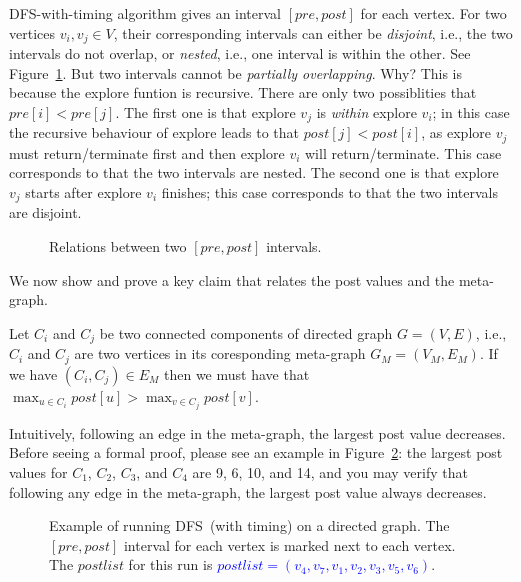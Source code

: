 DFS-with-timing algorithm gives an interval $[pre,post]$ for each vertex.
For two vertices $v_i,v_j\in V$, their corresponding intervals can either be
\emph{disjoint}, i.e., the two intervals do not overlap, or \emph{nested}, i.e.,
one interval is within the other. See Figure~\ref{fig:interval}.
But two intervals cannot be \emph{partially overlapping}. Why? This is because
the explore funtion is recursive. There are only two possiblities
that $pre[i] < pre[j]$. The first one is that explore $v_j$ is \emph{within} explore $v_i$;
in this case the recursive behaviour of explore leads to that $post[j] < post[i]$,
as explore $v_j$ must return/terminate first and then explore $v_i$ will return/terminate.
This case corresponds to that the two intervals are nested.
The second one is that explore $v_j$ starts after explore $v_i$ finishes;
this case corresponds to that the two intervals are disjoint.

\begin{figure}[h!]
\centering{}
\caption{Relations between two $[pre,post]$ intervals.}
\label{fig:interval}
\end{figure}

We now show and prove a key claim that relates the post values and the meta-graph.

\begin{claim}
Let $C_i$ and $C_j$ be two connected components of directed graph $G = (V, E)$, i.e., $C_i$ and $C_j$ are two
vertices in its coresponding meta-graph $G_M = (V_M, E_M)$. If we have $(C_i, C_j) \in E_M$ then
we must have that $\max_{u\in C_i} post[u] > \max_{v\in C_j} post[v]$.
\end{claim}

Intuitively, following an edge in the meta-graph, the largest post value decreases.
Before seeing a formal proof, please see an example in Figure~\ref{fig:dfs}:
the largest post values for $C_1$, $C_2$, $C_3$, and $C_4$ are 9, 6, 10, and 14,
and you may verify that following any edge in the meta-graph, the largest post value always decreases.

\begin{figure}[h!]
\centering{}
\caption{Example of running DFS~(with timing) on a directed graph. The $[pre,post]$ interval for each vertex
is marked next to each vertex.  The $postlist$ for this run is \textcolor{blue}{$postlist = (v_4,v_7,v_1,v_2,v_3,v_5,v_6)$}.  }
\label{fig:dfs}
\end{figure}



